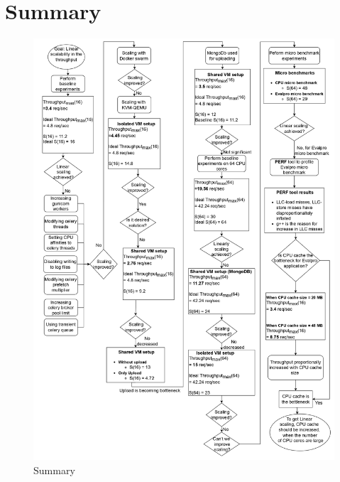 \documentclass[sigconf]{acmart}
\begin{document}
\section{Summary}
\begin{figure}
  \centering
  \includegraphics[scale=0.6]{Pictures/paper_summary.jpg}
  \caption{Summary}
  \label{paper_summary}
\end{figure}




\begin{acks}

\end{acks}



\end{document}

